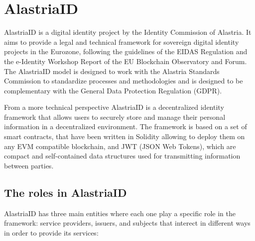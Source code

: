 \documentclass[target=mst,aauheader=]{thud}
\begin{document}
\section{AlastriaID}

AlastriaID is a digital identity project by the Identity Commission of Alastria. It aims to provide a legal and technical framework for sovereign digital identity projects in the Eurozone, following the guidelines of the EIDAS Regulation and the e-Identity Workshop Report of the EU Blockchain Observatory and Forum. The AlastriaID model is designed to work with the Alastria Standards Commission to standardize processes and methodologies and is designed to be complementary with the General Data Protection Regulation (GDPR).

From a more technical perspective AlastriaID is a decentralized identity framework that allows users to securely store and manage their personal information in a decentralized environment. The framework is based on a set of smart contracts, that have been written in Solidity allowing to deploy them on any EVM compatible blockchain, and JWT (JSON Web Tokens), which are compact and self-contained data structures used for transmitting information between parties. 

\subsection{The roles in AlastriaID}

AlastriaID has three main entities where each one play a specific role in the framework: service providers, issuers, and subjects that interect in different ways in order to provide its services:
\end{document}
